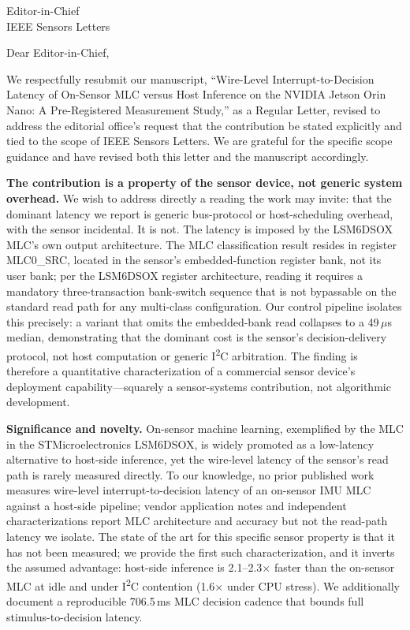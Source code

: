 \documentclass[11pt]{letter}
\begin{document}
\begin{letter}{Editor-in-Chief\\IEEE Sensors Letters}
\opening{Dear Editor-in-Chief,}

We respectfully resubmit our manuscript, ``Wire-Level Interrupt-to-Decision Latency of On-Sensor MLC versus Host Inference on the NVIDIA Jetson Orin Nano: A Pre-Registered Measurement Study,'' as a Regular Letter, revised to address the editorial office's request that the contribution be stated explicitly and tied to the scope of IEEE Sensors Letters. We are grateful for the specific scope guidance and have revised both this letter and the manuscript accordingly.

\textbf{The contribution is a property of the sensor device, not generic system overhead.} We wish to address directly a reading the work may invite: that the dominant latency we report is generic bus-protocol or host-scheduling overhead, with the sensor incidental. It is not. The latency is imposed by the LSM6DSOX MLC's own output architecture. The MLC classification result resides in register MLC0\_SRC, located in the sensor's embedded-function register bank, not its user bank; per the LSM6DSOX register architecture, reading it requires a mandatory three-transaction bank-switch sequence that is not bypassable on the standard read path for any multi-class configuration. Our control pipeline isolates this precisely: a variant that omits the embedded-bank read collapses to a 49\,$\mu$s median, demonstrating that the dominant cost is the sensor's decision-delivery protocol, not host computation or generic I\textsuperscript{2}C arbitration. The finding is therefore a quantitative characterization of a commercial sensor device's deployment capability---squarely a sensor-systems contribution, not algorithmic development.

\textbf{Significance and novelty.} On-sensor machine learning, exemplified by the MLC in the STMicroelectronics LSM6DSOX, is widely promoted as a low-latency alternative to host-side inference, yet the wire-level latency of the sensor's read path is rarely measured directly. To our knowledge, no prior published work measures wire-level interrupt-to-decision latency of an on-sensor IMU MLC against a host-side pipeline; vendor application notes and independent characterizations report MLC architecture and accuracy but not the read-path latency we isolate. The state of the art for this specific sensor property is that it has not been measured; we provide the first such characterization, and it inverts the assumed advantage: host-side inference is 2.1--2.3$\times$ faster than the on-sensor MLC at idle and under I\textsuperscript{2}C contention (1.6$\times$ under CPU stress). We additionally document a reproducible 706.5\,ms MLC decision cadence that bounds full stimulus-to-decision latency.


\end{letter}
\end{document}
